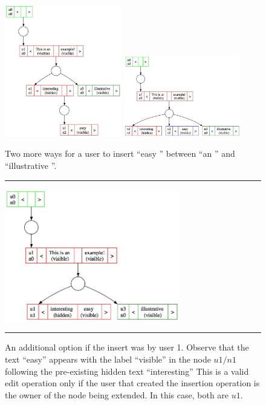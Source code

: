 \documentclass{amsart}
\begin{document}
\begin{figure}[h]


\centering
\includegraphics[width=2in]{tree14c.jpg}
\includegraphics[width=2in]{tree14e.jpg}

\caption{Two more ways for a user to insert ``easy '' 
between ``an '' and ``illustrative ''.\label{fig:tree14b}}


\vspace{\baselineskip}
  \hspace{\fill}\rule{\linewidth}{.7pt}\hspace{\fill}
  \vspace{\baselineskip}

\includegraphics[width=3in]{tree14d.jpg}

\caption{An additional option if the insert was by user 1.
Observe that the text ``easy'' appears with the label ``visible''
in the node $u1/n1$ following the pre-existing hidden text
``interesting'' This is a valid edit operation only if the user
that created the insertion operation is the owner of the node
being extended. In this case, both are $u1$. \label{fig:tree14d}}

\vspace{\baselineskip}%
  \hspace{\fill}\rule{\linewidth}{.7pt}\hspace{\fill}%
\vspace{\baselineskip}%
\end{figure}
\end{document}
